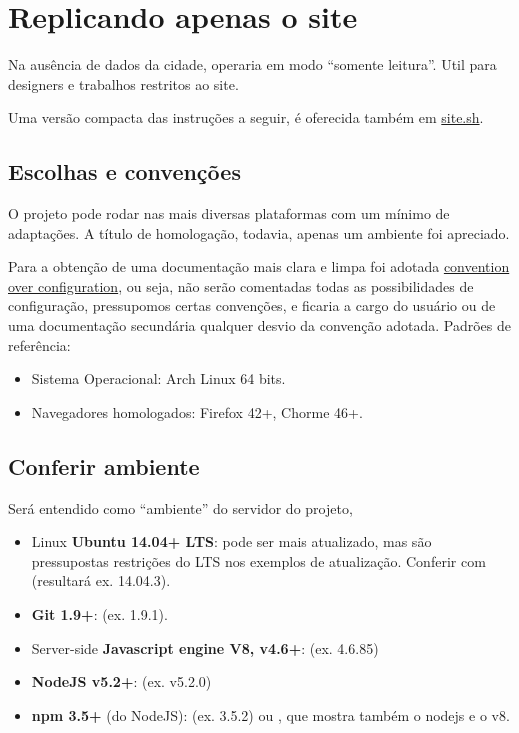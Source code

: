 \documentclass[letterpaper,10pt,brazil]{sphinxmanual}
\begin{document}
\section{Replicando apenas o site}
\label{index:replicando-apenas-o-site}
Na ausência de dados da cidade, operaria em modo ``somente leitura''. Util
para designers e trabalhos restritos ao site.

Uma versão compacta das instruções a seguir, é oferecida também em \href{https://github.com/okfn-brasil/cuidando2-doc/blob/master/src/site.sh}{site.sh}.


\subsection{Escolhas e convenções}
\label{install-site::doc}\label{install-site:escolhas-e-convencoes}
O projeto pode rodar nas mais diversas plataformas com um mínimo de
adaptações. A título de homologação, todavia, apenas um ambiente foi
apreciado.

Para a obtenção de uma documentação mais clara e limpa foi adotada
\href{https://en.wikipedia.org/wiki/Convention\_over\_configuration}{convention over
configuration},
ou seja, não serão comentadas todas as possibilidades de configuração,
pressupomos certas convenções, e ficaria a cargo do usuário ou de uma
documentação secundária qualquer desvio da convenção adotada. Padrões de
referência:
\begin{itemize}
\item {} 
Sistema Operacional: Arch Linux 64 bits.

\item {} 
Navegadores homologados: Firefox 42+, Chorme 46+.

\end{itemize}


\subsection{Conferir ambiente}
\label{install-site:conferir-ambiente}
Será entendido como ``ambiente'' do servidor do projeto,
\begin{itemize}
\item {} 
Linux \textbf{Ubuntu 14.04+ LTS}: pode ser mais atualizado, mas são
pressupostas restrições do LTS nos exemplos de atualização. Conferir
com  (resultará ex. 14.04.3).

\item {} 
\textbf{Git 1.9+}:  (ex. 1.9.1).

\item {} 
Server-side \textbf{Javascript engine V8, v4.6+}:
 (ex. 4.6.85)

\item {} 
\textbf{NodeJS v5.2+}: (ex. v5.2.0)

\item {} 
\textbf{npm 3.5+} (do NodeJS):  (ex. 3.5.2) ou ,
que mostra também o nodejs e o v8.

\end{itemize}
\end{document}
